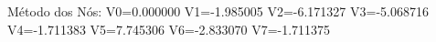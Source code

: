 Método dos Nós: 
V0=0.000000 
V1=-1.985005 
V2=-6.171327 
V3=-5.068716 
V4=-1.711383 
V5=7.745306 
V6=-2.833070 
V7=-1.711375